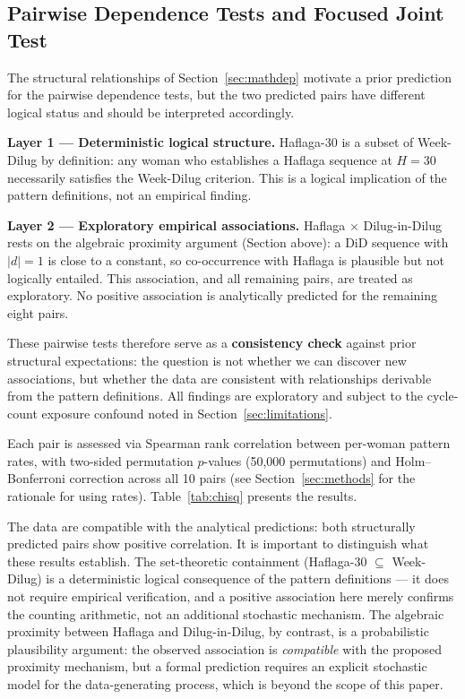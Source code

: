 \documentclass[12pt]{article}
\begin{document}
\subsection{Pairwise Dependence Tests and Focused Joint Test}
\label{sec:chisq}

The structural relationships of Section~\ref{sec:mathdep} motivate a prior prediction
for the pairwise dependence tests, but the two predicted pairs have different logical
status and should be interpreted accordingly.

\textbf{Layer 1 — Deterministic logical structure.} Haflaga-30 is a subset of
Week-Dilug by definition: any woman who establishes a Haflaga sequence at $H = 30$
necessarily satisfies the Week-Dilug criterion. This is a logical implication of the
pattern definitions, not an empirical finding.

\textbf{Layer 2 — Exploratory empirical associations.} Haflaga $\times$
Dilug-in-Dilug rests on the algebraic proximity argument (Section above): a DiD
sequence with $|d| = 1$ is close to a constant, so co-occurrence with Haflaga is
plausible but not logically entailed. This association, and all remaining pairs, are
treated as exploratory. No positive association is analytically predicted for the
remaining eight pairs.

These pairwise tests therefore serve as a \textbf{consistency check} against prior
structural expectations: the question is not whether we can discover new associations,
but whether the data are consistent with relationships derivable from the pattern
definitions. All findings are exploratory and subject to the cycle-count exposure
confound noted in Section~\ref{sec:limitations}.

Each pair is assessed via Spearman rank correlation between per-woman pattern
rates, with two-sided permutation $p$-values (50,000 permutations) and
Holm--Bonferroni correction across all 10 pairs (see Section~\ref{sec:methods}
for the rationale for using rates). Table~\ref{tab:chisq} presents the results.

The data are compatible with the analytical predictions: both structurally predicted
pairs show positive correlation. It is important to distinguish what these results
establish. The set-theoretic containment (Haflaga-30 $\subseteq$ Week-Dilug) is a
deterministic logical consequence of the pattern definitions --- it does not require
empirical verification, and a positive association here merely confirms the
counting arithmetic, not an additional stochastic mechanism. The algebraic proximity
between Haflaga and Dilug-in-Dilug, by contrast, is a probabilistic plausibility
argument: the observed association is \emph{compatible} with the proposed proximity
mechanism, but a formal prediction requires an explicit stochastic model for the
data-generating process, which is beyond the scope of this paper.
\end{document}
